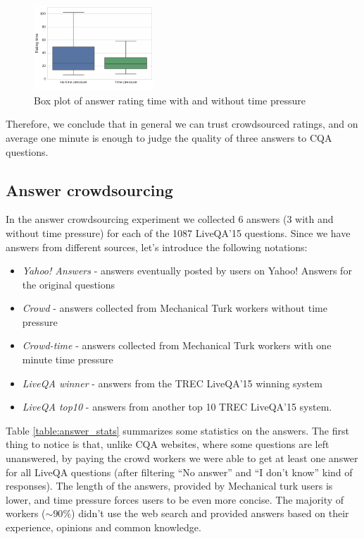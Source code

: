 \documentclass[11pt,letterpaper]{article}
\begin{document}
\begin{figure}[t!]
	\centering
	\includegraphics[width=0.4\textwidth]{img/validation_time}
	\caption{Box plot of answer rating time with and without time pressure}
	\label{figure:validation_time}
\end{figure}


Therefore, we conclude that in general we can trust crowdsourced ratings, and on average one minute is enough to judge the quality of three answers to CQA questions.

\subsection{Answer crowdsourcing}
\label{subsec:results:answer_crowd}

In the answer crowdsourcing experiment we collected 6 answers (3 with and without time pressure) for each of the 1087 LiveQA'15 questions.
Since we have answers from different sources, let's introduce the following notations:
\vspace{-0.25cm}
\begin{itemize}
\setlength{\itemsep}{0pt}
\setlength{\parskip}{0pt}
	\item \textit{Yahoo! Answers} - answers eventually posted by users on Yahoo! Answers for the original questions
	\item \textit{Crowd} - answers collected from Mechanical Turk workers without time pressure
	\item \textit{Crowd-time} - answers collected from Mechanical Turk workers with one minute time pressure
	\item \textit{LiveQA winner} - answers from the TREC LiveQA'15 winning system
	\item \textit{LiveQA top10} - answers from another top 10 TREC LiveQA'15 system.
\end{itemize}
\vspace{-0.3cm}	

Table \ref{table:answer_stats} summarizes some statistics on the answers.
The first thing to notice is that, unlike CQA websites, where some questions are left unanswered, by paying the crowd workers we were able to get at least one answer for all LiveQA questions (after filtering ``No answer'' and ``I don't know'' kind of responses).
The length of the answers, provided by Mechanical turk users is lower, and time pressure forces users to be even more concise.
The majority of workers ($\sim90 \%$) didn't use the web search and provided answers based on their experience, opinions and common knowledge.
\end{document}
